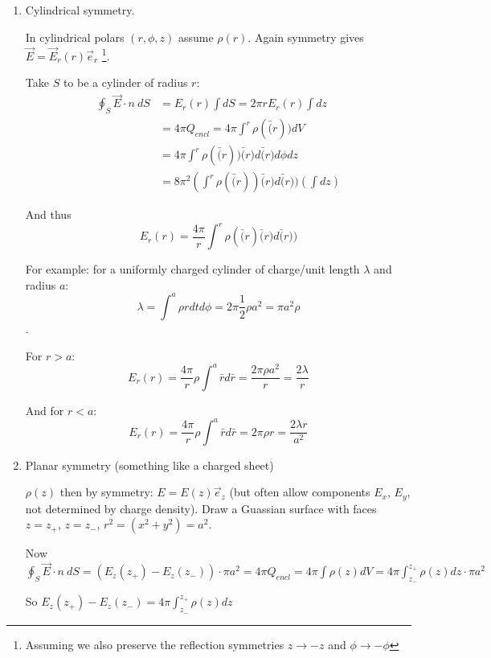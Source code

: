 \begin{enumerate}
\item Cylindrical symmetry.

In cylindrical polars $(r, \phi, z)$ assume $\rho(r)$. Again symmetry gives $\vec{E} = \vec{E}_r (r) \vec{e}_r$ \footnote{Assuming we also preserve the reflection symmetries $z \rightarrow -z$ and $\phi \rightarrow -\phi$}.

Take $S$ to be a cylinder of radius $r$: 
\begin{align*}
\oint_S \vec{E}\cdot {n} ~dS &= E_r(r) \int dS = 2\pi r E_r(r) \int dz \\
&= 4 \pi Q_{encl} = 4 \pi \int^r \rho(\bar(r)) dV \\
&= 4 \pi \int^r \rho(\bar(r)) \bar(r) d\bar(r) d\phi dz \\
&= 8 \pi^2 (\int^r \rho(\bar(r)) \bar(r) d\bar(r))(\int dz) 
\end{align*}

And thus
\begin{equation} 
E_r(r) = \frac{4\pi}{r} \int^r \rho (\bar(r) \bar(r) d\bar(r))
\end{equation}

For example: for a uniformly charged cylinder of charge/unit length $\lambda$ and radius $a$: $$\lambda = \int^a \rho r dt d\phi = 2 \pi \frac{1}{2} \rho a^2 = \pi a^2 \rho$$.

For $r>a$: $$E_r(r) = \frac{4 \pi}{r} \rho \int^a \bar{r} d\bar{r} = \frac{2 \pi \rho a^2}{r} = \frac{2 \lambda}{r}$$

And for $r<a$: $$E_r(r) = \frac{4 \pi}{r} \rho \int^a \bar{r} d\bar{r} = 2 \pi \rho r = \frac{2 \lambda r}{a^2}$$

\item Planar symmetry (something like a charged sheet)

$\rho(z)$ then by symmetry: $E = E(z) \vec{e}_z$ (but often allow components $E_x$, $E_y$, not determined by charge density). Draw a Guassian surface with faces $z=z_+$, $z=z_-$, $r^2 = (x^2 + y^2) = a^2$.

Now $\oint_S \vec{E}\cdot {n} ~dS = (E_z (z_+) - E_z(z_-)) \cdot \pi a^2 = 4 \pi Q_{encl} = 4 \pi \int \rho(z) dV = 4 \pi \int_{z_-}^{z_+} \rho (z) dz \cdot \pi a^2$

So $E_z (z_+) - E_z(z_-) = 4 \pi \int_{z_-}^{z_+} \rho(z) dz$

\end{enumerate}